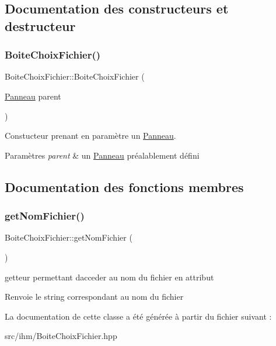 \subsection{Documentation des constructeurs et destructeur}
\mbox{\label{classBoiteChoixFichier_a083c181fc64db190094be5bc3803e52b}} 
\subsubsection{\texorpdfstring{Boite\+Choix\+Fichier()}{BoiteChoixFichier()}}
{\footnotesize\ttfamily Boite\+Choix\+Fichier\+::\+Boite\+Choix\+Fichier (\begin{DoxyParamCaption}\item[{\hyperlink{classPanneau}{Panneau}}]{parent }\end{DoxyParamCaption})}



Constucteur prenant en paramètre un \hyperlink{classPanneau}{Panneau}. 


\begin{DoxyParams}{Paramètres}
{\em parent} & un \hyperlink{classPanneau}{Panneau} préalablement défini \\
\hline
\end{DoxyParams}


\subsection{Documentation des fonctions membres}
\mbox{\label{classBoiteChoixFichier_a0e051fe462c74d12ecea8a1c3bd7fad5}} 
\subsubsection{\texorpdfstring{get\+Nom\+Fichier()}{getNomFichier()}}
{\footnotesize\ttfamily Boite\+Choix\+Fichier\+::get\+Nom\+Fichier (\begin{DoxyParamCaption}{ }\end{DoxyParamCaption})}



getteur permettant d\textquotesingle{}acceder au nom du fichier en attribut 

\begin{DoxyReturn}{Renvoie}
le string correspondant au nom du fichier 
\end{DoxyReturn}


La documentation de cette classe a été générée à partir du fichier suivant \+:\begin{DoxyCompactItemize}
\item 
src/ihm/Boite\+Choix\+Fichier.\+hpp\end{DoxyCompactItemize}

